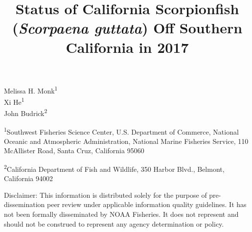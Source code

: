 \documentclass[12pt,]{article}
\title{Status of California Scorpionfish (\emph{Scorpaena guttata}) Off
Southern California in 2017}
\author{}
\date{}
\begin{document}
\maketitle


\begin{center}
\thispagestyle{empty}


\vspace{.5cm}




Melissa H. Monk\textsuperscript{1}\\
Xi He\textsuperscript{1}\\
John Budrick\textsuperscript{2}\\

\vspace{.5cm}

\small
\textsuperscript{1}Southwest Fisheries Science Center, U.S. Department of Commerce, National Oceanic and Atmospheric Administration, National Marine Fisheries Service, 110 McAllister Road, Santa Cruz, California 95060\\

\vspace{.3cm}

\textsuperscript{2}California Department of Fish and Wildlife, 350 Harbor Blvd., Belmont, California 94002\\


\vspace{.5cm}

\vfill
Disclaimer: This information is distributed solely for the purpose of pre-dissemination
peer review under applicable information quality guidelines. It has not been formally
disseminated by NOAA Fisheries. It does not represent and should not be construed to
represent any agency determination or policy. 

\vspace{.3cm}



\end{center}
\end{document}
